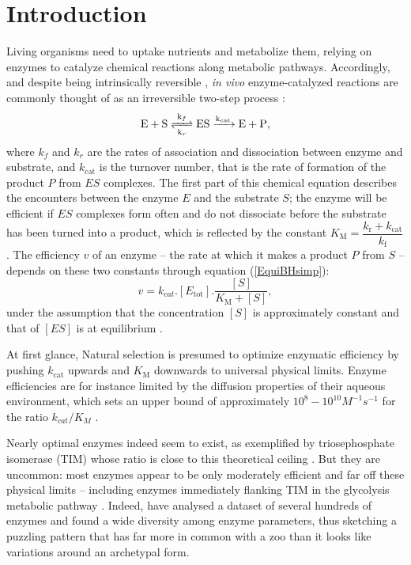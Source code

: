 \documentclass[11pt,onecolumn]{article}
\begin{document}
\section{{Introduction}\label{sec:Intro}}

Living organisms need to uptake nutrients and metabolize them, relying on enzymes to catalyze chemical reactions along metabolic pathways. Accordingly, and despite being intrinsically reversible \citep{Haldane30,Klipp94}, \textit{in vivo} enzyme-catalyzed reactions are commonly thought of as an irreversible two-step process \citep{Bar-Even11,Bar-Even15,MichaelisMenten1913,Johnson11}:
\begin{equation}
\ce{ E + S <=>[k_{f}][k_{r}] ES ->[k_{cat}] E + P },
\label{chemMM}
\end{equation}
where $k_f$ and $k_r$ are the rates of association and dissociation between enzyme and substrate, and $k_\text{cat}$ is the turnover number, that is the rate of formation of the product $P$ from $ES$ complexes. The first part of this chemical equation describes the encounters between the enzyme $E$ and the substrate $S$; the enzyme will be efficient if $ES$ complexes form often and do not dissociate before the substrate has been turned into a product, which is reflected by the constant $K_\text{M}=\dfrac{k_\text{r}+k_\text{cat}}{k_\text{f}}$. The efficiency $v$ of an enzyme -- the rate at which it makes a product $P$ from $S$ -- depends on these two constants through equation (\ref{EquiBHsimp}):
\begin{equation}
v=k_{cat}.[E_\text{tot}].\frac{[S]}{K_\text{M}+[S]},
\label{EquiBHsimp}
\end{equation}
\noindent under the assumption that the concentration $[S]$ is approximately constant and that of $[ES]$ is at equilibrium \citep{MichaelisMenten1913, Briggs25}.
 
At first glance, Natural selection is presumed to optimize enzymatic efficiency by pushing $k_\text{cat}$ upwards and $K_\text{M}$ downwards to universal physical limits. Enzyme efficiencies are for instance limited by the diffusion properties of their aqueous environment, which sets an upper bound of approximately $10^8-10^{10} M^{-1}s^{-1}$ for the ratio ${k_{cat}}/{K_M}$  \citep{Alberty58,Zhou82}.

Nearly optimal enzymes indeed seem to exist, as exemplified by triosephosphate isomerase (TIM) whose ratio is close to this theoretical ceiling \citep{Knowles77}. But they are uncommon: most enzymes appear to be only moderately efficient and far off these physical limits -- including enzymes immediately flanking TIM in the glycolysis metabolic pathway \citep{Davidi18}.
Indeed, \citet{Bar-Even11} have analysed a dataset of several hundreds of enzymes and found a wide diversity among enzyme parameters, thus sketching a puzzling pattern that has far more in common with a zoo than it looks like variations around an archetypal form. 
\end{document}
